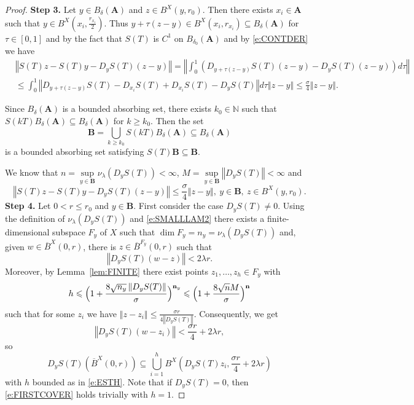 \documentclass[a4paper,12pt,reqno]{amsart}
\theoremstyle{plain}
\theoremstyle{definition}
\numberwithin{equation}{section}
\newcommand{\N}{\mathbb{N}}
\newcommand{\norm}[1]{\left\Vert#1\right\Vert}
\renewcommand{\geq}{\geqslant}
\renewcommand{\leq}{\leqslant}
\begin{document}
\begin{proof}
\textbf{Step 3.} 
Let  $y\in B_{\delta}(\mathbf{A})$ and $z\in B^{X}(y,r_0)$. 
Then there exists $x_i\in\mathbf{A}$ such that $y\in B^{X}(x_i,\frac{r_{x_i}}{2})$. Thus $y+\tau(z-y)\in B^{X}(x_i,r_{x_i})\subseteq B_{\delta}(\mathbf{A})$ for $\tau\in[0,1]$ and by the fact that $S(T)$ is $C^1$ on $B_{\delta_0}(\mathbf{A})$ and by \eqref{e:CONTDER} we have
\begin{equation*}
\begin{split}
&\norm{S(T)z-S(T)y-D_y S(T)(z-y)}=\norm{\int_{0}^{1}(D_{y+\tau(z-y)}S(T)(z-y)-D_y S(T)(z-y))d\tau}\\
&\leq\int_0^1\norm{D_{y+\tau(z-y)}S(T)-D_{x_i}S(T)+D_{x_i}S(T)-D_y S(T)}d\tau\norm{z-y}\leq\frac{\sigma}{4}\norm{z-y}.
\end{split}
\end{equation*}

Since $B_{\delta}(\mathbf{A})$ is a bounded absorbing set, there exists $k_0\in\N$ such that
 $S(kT)B_\delta(\mathbf{A})\subseteq B_\delta(\mathbf{A})$ for $k\geq k_0$. Then the set
$$\mathbf{B}=\bigcup_{k\geq k_0}S(kT)B_\delta(\mathbf{A})\subseteq B_\delta(\mathbf{A})$$
is a bounded absorbing set satisfying $S(T)\mathbf{B}\subseteq\mathbf{B}$.

We know that $n=\sup\limits_{y\in \mathbf{B}}\nu_{\lambda}(D_y S(T))<\infty$, $M=\sup\limits_{y\in \mathbf{B}}\norm{D_{y} S(T)}<\infty$ and
\begin{equation}\label{e:THETAR2}
\norm{S(T)z-S(T)y-D_{y}S(T)(z-y)}\leq\frac{\sigma}{4}\norm{z-y},\ y\in \mathbf{B},\ z\in B^{X}(y,r_0). 
\end{equation}
\textbf{Step 4.} 
Let $0<r\leq r_0$ and $y\in\mathbf{B}$. First consider the case $D_y S(T)\neq 0$. Using the definition of $\nu_{\lambda}(D_y S(T))$ and \eqref{e:SMALLLAM2} there exists a finite-dimensional subspace $F_y$ of $X$ such that
$\dim F_y=n_y=\nu_{\lambda}(D_y S(T))$ and, given $w\in \overline{B}^{X}(0,r)$, there is $z\in\overline{B}^{F_y}(0,r)$ such that
$$\norm{D_y S(T)(w-z)}<2\lambda r.$$
Moreover, by Lemma~\ref{lem:FINITE} there exist points $z_1,\ldots,z_h\in F_y$ with 
\begin{equation}\label{e:ESTH}
h\leq\Bigl(1+\frac{8\sqrt{n_y}\norm{D_y S(T)}}{\sigma}\Bigr)^{\mathbf{n}_y}\leq \Bigl(1+\frac{8\sqrt{n}M}{\sigma}\Bigr)^{\mathbf{n}}
\end{equation}
such that for some $z_i$ we have $\norm{z-z_i}\leq\frac{\sigma r}{4\norm{D_y S(T)}}$. Consequently, we get
$$\norm{D_y S(T)(w-z_i)}<\frac{\sigma r}{4}+2\lambda r,$$
so
\begin{equation}\label{e:FIRSTCOVER}
D_y S(T)(\overline{B}^{X}(0,r))\subseteq\bigcup_{i=1}^{h}B^{X}(D_y S(T)z_i, \frac{\sigma r}{4}+2\lambda r)
\end{equation} 
with $h$ bounded as in \eqref{e:ESTH}.
Note that if $D_y S(T)=0$, then \eqref{e:FIRSTCOVER} holds trivially with $h=1$.


\end{proof}
\end{document}
